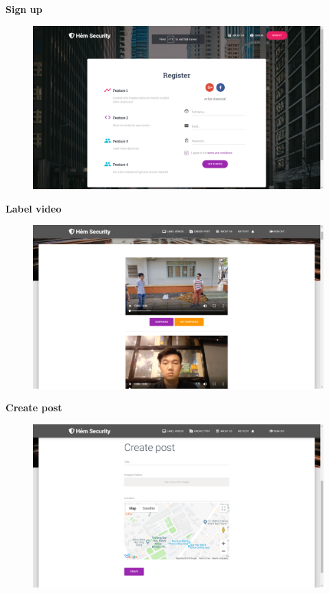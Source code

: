 \textbf{Sign up}
\begin{center}
    \begin{figure}[H]
    \centering
    \includegraphics[width=1\columnwidth]{images/chap4/signup_form.png}
    \end{figure}
\end{center}

\textbf{Label video}
\begin{center}
    \begin{figure}[H]
    \centering
    \includegraphics[width=1\columnwidth]{images/chap4/label_video.png}
    \end{figure}
\end{center}

\textbf{Create post}
\begin{center}
    \begin{figure}[H]
    \centering
    \includegraphics[width=1\columnwidth]{images/chap4/create_post.png}
    \end{figure}
\end{center}

